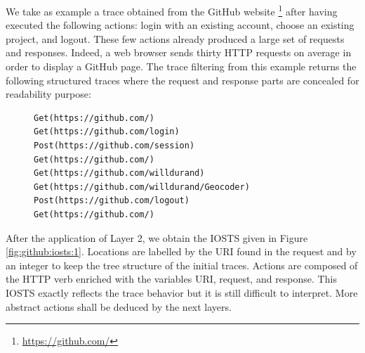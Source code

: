 \begin{example}
We take as example a trace obtained from the GitHub website
\footnote{\url{https://github.com/}} after having executed the
following actions: login with an existing account, choose an
existing project, and logout. These few actions already produced
a large set of requests and responses. Indeed, a web browser
sends thirty HTTP requests on average in order to display a
GitHub page. The trace filtering from this example returns the
following structured traces where the request and response parts
are concealed for readability purpose:

\begin{figure}[ht]
\begin{BVerbatim}
Get(https://github.com/)
Get(https://github.com/login)
Post(https://github.com/session)
Get(https://github.com/)
Get(https://github.com/willdurand)
Get(https://github.com/willdurand/Geocoder)
Post(https://github.com/logout)
Get(https://github.com/)
\end{BVerbatim}
\end{figure}

After the application of Layer 2, we obtain the IOSTS given in Figure
\ref{fig:github:iosts:1}. Locations are labelled by the URI found
in the request and by an integer to keep the tree structure of
the initial traces. Actions are composed of the HTTP verb
enriched with the variables URI, request, and response. This
IOSTS exactly reflects the trace behavior but it is still
difficult to interpret. More abstract actions shall be deduced by
the next layers.
\end{example}


